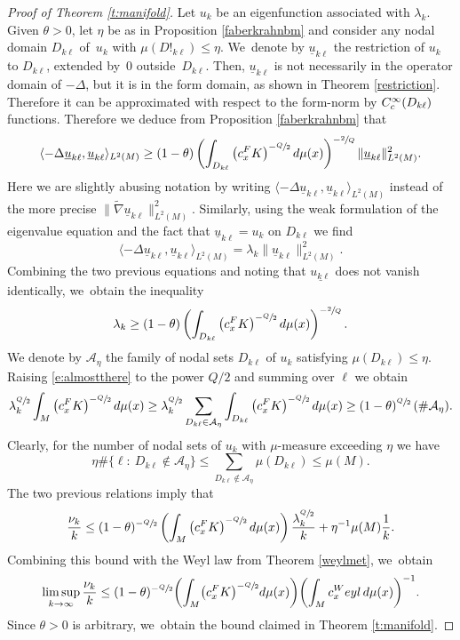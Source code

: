 \documentclass[11pt]{article}
\let\oldsfrac\sfrac
\renewcommand{\sfrac}[2]{{\oldsfrac{#1}{#2}}}
\newcommand{\rc}{\textup{c}}
\newcommand{\FK}{\textup{FK}}
\newcommand{\Weyl}{\textup{Weyl}}
\theoremstyle{definition}
\newcommand{\1}{\mathbbm{1}}
\numberwithin{equation}{section}
\begin{document}
\begin{proof}[Proof of Theorem \ref{t:manifold}]
Let $u_k$ be an eigenfunction associated with $\lambda_k$. Given \hbox{$\theta>0$}, let $\eta$ be as in Proposition \ref{faberkrahnbm} and consider any nodal domain $D_{k\ell}$ of~$u_k$ with \hbox{$\mu(D!_{k\ell})\leq\eta$}. We~denote by $\underline{u}_{k\ell}$ the restriction of $u_k$ to $D_{k\ell}$, extended by~$0$ out\-side~$D_{k\ell}$. Then, $\underline{u}_{k\ell}$ is not necessarily in the operator domain of $-\Delta$, but it is in the form domain, as shown in Theorem \ref{restriction}. Therefore it can be approximated with respect to the form-norm by $C^\infty_\rc(D_{k\ell})$ functions. Therefore we deduce from Proposition \ref{faberkrahnbm} that
\[
\langle -\Delta \underline{u}_{k\ell},\underline{u}_{k\ell}\rangle_{L^2(M)}
\geq (1-\theta) \left(\int_{D_{k\ell}} \left(c_x^\FK\right)^{-\sfrac Q2} d\mu(x)\right)^{-\sfrac 2Q} \| \underline{u}_{k\ell} \|_{L^2(M)}^2.
\]
Here we are slightly abusing notation by writing $\langle -\Delta \underline{u}_{k\ell},\underline{u}_{k\ell}\rangle_{L^2(M)}$ instead of the more precise $\| \tilde \nabla \underline{u}_{k\ell}\|^2_{L^2(M)}$. Similarly, using the weak formulation of the eigenvalue equation and the fact that $\underline{u}_{k\ell}=u_k$ on $D_{k\ell}$ we find
\[
\langle -\Delta \underline{u}_{k\ell},\underline{u}_{k\ell}\rangle_{L^2(M)} = \lambda_k \|\underline{u}_{k\ell}\|_{L^2(M)}^{2}.
\]
Combining the two previous equations and noting that $\underline{u_{k\ell}}$ does not vanish identically, we~obtain the inequality
\begin{equation}\label{e:almostthere}
\lambda_k \geq (1-\theta) \left(\int_{D_{k\ell}} \left(c_x^\FK\right)^{-\sfrac Q2} d\mu(x)\right)^{-\sfrac 2Q}.
\end{equation}
We denote by $\mathcal A_\eta$ the family of nodal sets $D_{k\ell}$ of $u_k$ satisfying $\mu(D_{k\ell})\leq \eta$. Raising \eqref{e:almostthere} to the power $Q/2$ and summing over $\ell$ we obtain
\[
\lambda_k^{\sfrac Q2} \int_M \left(c_x^\FK\right)^{-\sfrac Q2} d\mu(x)
\geq \lambda_k^{\sfrac Q2} \sum_{D_{k\ell}\in \mathcal{A}_\eta} \int_{D_{k\ell}} \left(c_x^\FK\right)^{-\sfrac Q2} d\mu(x) \geq (1-\theta)^{\sfrac Q2} \,(\#\mathcal{A}_\eta).
\]
Clearly, for the number of nodal sets of $u_k$ with $\mu$-measure exceeding $\eta$ we have
\[
\eta \#\{ \ell:\ D_{k\ell}\not\in \mathcal A_\eta \} \leq \sum_{D_{k\ell}\not\in \mathcal{A}_\eta} \mu(D_{k\ell}) \leq \mu(M).
\]
The two previous relations imply that
\[
\frac{\nu_k}{k} \leq (1-\theta)^{-\sfrac Q2} \left(\int_M \left(c_x^\FK\right)^{-\sfrac Q2} d\mu(x)\right) \frac{\lambda_k^{\sfrac{Q}{2}}}{k} + \eta^{-1} \mu(M) \frac{1}{k}.
\]
Combining this bound with the Weyl law from Theorem \ref{weylmet}, we~obtain
\[
\limsup_{k\to\infty} \frac{\nu_k}{k}\leq (1-\theta)^{-\sfrac Q2} \biggl(\int_M\bigl(c_x^\FK\bigr)^{-\sfrac Q2} d\mu(x) \biggr) \biggl(\int_M c_x^\Weyl \,d\mu(x) \biggr)^{-1}.
\]
Since $\theta>0$ is arbitrary, we~obtain the bound claimed in Theorem \ref{t:manifold}.
\end{proof}
\end{document}
